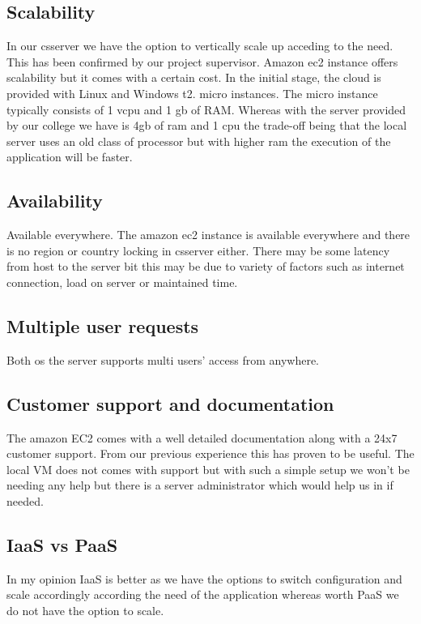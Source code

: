 \documentclass{article}
\begin{document}
\subsection{Scalability} In our csserver we have the option to vertically scale up acceding to the need. This has been confirmed by our project supervisor. Amazon ec2 instance offers scalability but it comes with a certain cost. In the initial stage, the cloud is provided with Linux and Windows t2. micro instances. The micro instance typically consists of 1 vcpu and 1 gb of RAM. Whereas with the server provided by our college we have is 4gb of ram and 1 cpu the trade-off being that the local server uses an old class of processor but with higher ram the execution of the application will be faster.

\subsection{Availability}Available everywhere. The amazon ec2 instance is available everywhere and there is no region or country locking in csserver either. There may be some latency from host to the server bit this may be due to variety of factors such as internet connection, load on server or maintained time.

\subsection{Multiple user requests}Both os the server supports multi users’ access from anywhere.

\subsection{Customer support and documentation}The amazon EC2 comes with a well detailed documentation along with a 24x7 customer support. From our previous experience this has proven to be useful. The local VM does not comes with support but with such a simple setup we won’t be needing any help but there is a server administrator which would help us in if needed. 

\subsection{IaaS vs PaaS}In my opinion IaaS is better as we have the options to switch configuration and scale accordingly according the need of the application whereas worth PaaS we do not have the option to scale.
\end{document}
